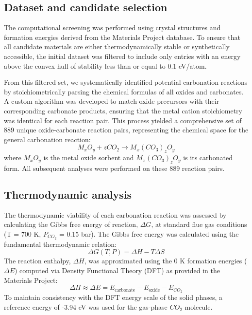 \documentclass[]{article}
\begin{document}
\subsection{Dataset and candidate selection}
The computational screening was performed using crystal structures and formation energies derived from the Materials Project database. To ensure that all candidate materials are either thermodynamically stable or synthetically accessible, the initial dataset was filtered to include only entries with an energy above the convex hull of stability less than or equal to 0.1 eV/atom. 

From this filtered set, we systematically identified potential carbonation reactions by stoichiometrically parsing the chemical formulas of all oxides and carbonates. A custom algorithm was developed to match oxide precursors with their corresponding carbonate products, ensuring that the metal cation stoichiometry was identical for each reaction pair. This process yielded a comprehensive set of 889 unique oxide-carbonate reaction pairs, representing the chemical space for the general carbonation reaction:
\begin{equation}
    M_xO_y + zCO_2 \rightarrow M_x(CO_3)_zO_y
\end{equation}
where $M_xO_y$ is the metal oxide sorbent and $M_x(CO_3)_zO_y$ is its carbonated form. All subsequent analyses were performed on these 889 reaction pairs.

\subsection{Thermodynamic analysis}
The thermodynamic viability of each carbonation reaction was assessed by calculating the Gibbs free energy of reaction, $\Delta G$, at standard flue gas conditions (T = 700 K, $P_{CO_2}$ = 0.15 bar). The Gibbs free energy was calculated using the fundamental thermodynamic relation:
\begin{equation}
    \Delta G(T, P) = \Delta H - T\Delta S
\end{equation}
The reaction enthalpy, $\Delta H$, was approximated using the 0 K formation energies ($\Delta E$) computed via Density Functional Theory (DFT) as provided in the Materials Project:
\begin{equation}
    \Delta H \approx \Delta E = E_{\text{carbonate}} - E_{\text{oxide}} - E_{CO_2}
\end{equation}
To maintain consistency with the DFT energy scale of the solid phases, a reference energy of -3.94 eV was used for the gas-phase $CO_2$ molecule.
\end{document}
